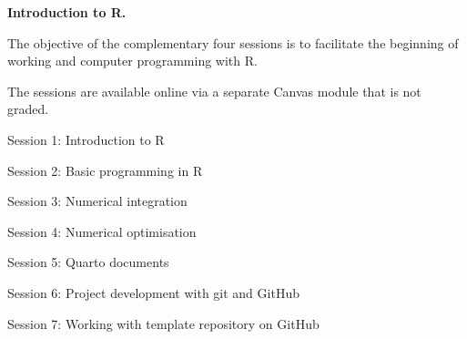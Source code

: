 \documentclass[10pt]{article}
\begin{document}
\begin{multicols}{2}
\bigskip\noindent\textbf{Introduction to R.} 

\smallskip\noindent The objective of the complementary four sessions is to facilitate the beginning of working and computer programming with R. 

\smallskip\noindent The sessions are available online via a separate Canvas module that is not graded. 

\smallskip\noindent Session 1: Introduction to R

\smallskip\noindent Session 2: Basic programming in R

\smallskip\noindent Session 3: Numerical integration

\smallskip\noindent Session 4: Numerical optimisation

\smallskip\noindent Session 5: Quarto documents

\smallskip\noindent Session 6: Project development with git and GitHub

\smallskip\noindent Session 7: Working with template repository on GitHub


\vfill\null
\columnbreak


\end{multicols}
\end{document}
